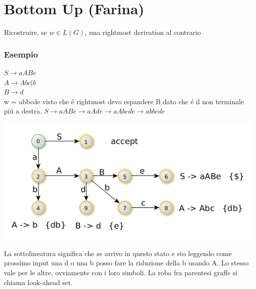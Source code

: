 \chapter{Bottom Up (Farina)}
Ricostruire, se $w \in L(G)$, una rightmost derivation al contrario
\subsection{Esempio}
$S \rightarrow aABe$\\
$A \rightarrow Abc|b$\\
$B \rightarrow d$\\

w = abbcde visto che \'e rightmost devo espandere B dato che \'e il non terminale pi\'u a destra.
$S \rightarrow aABe \rightarrow aAde \rightarrow aAbcde \rightarrow abbcde $\\

\begin{center}
    \includegraphics[scale=0.6]{Chapters/Img/c02_14.png}\\
\end{center} 

La sottolineatura significa che se arrivo in questo stato e sto leggendo come prossimo input una d o una b posso fare la riduzione della b usando A. Lo stesso vale per le altre, ovviamente con i loro simboli.
La roba fra parentesi graffe si chiama look-ahead set.

